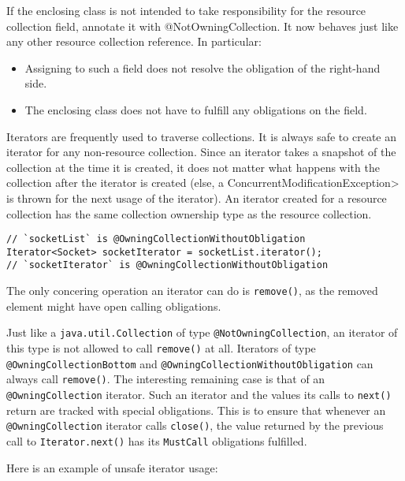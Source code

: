 If the enclosing class is not intended to take responsibility for the resource collection field, annotate it with @NotOwningCollection. It now behaves just like any other resource collection reference. In particular:

\begin{itemize}
  \item Assigning to such a field does not resolve the obligation of the right-hand side.
  \item The enclosing class does not have to fulfill any obligations on the field.
\end{itemize}

Iterators are frequently used to traverse collections. It is always safe to create an iterator for any non-resource collection. Since an iterator takes a snapshot of the collection at the time it is created, it does not matter what happens with the collection after the iterator is created (else, a \<ConcurrentModificationException> is thrown for the next usage of the iterator).
An iterator created for a resource collection has the same collection ownership type as the resource collection.

\begin{verbatim}
// `socketList` is @OwningCollectionWithoutObligation
Iterator<Socket> socketIterator = socketList.iterator();
// `socketIterator` is @OwningCollectionWithoutObligation
\end{verbatim}

The only concering operation an iterator can do is \texttt{remove()}, as the removed element might have open calling obligations.

Just like a \texttt{java.util.Collection} of type \texttt{@NotOwningCollection}, an iterator of this type is not allowed to call \texttt{remove()} at all. Iterators of type \texttt{@OwningCollectionBottom} and \texttt{@OwningCollectionWithoutObligation} can always call \texttt{remove()}. The interesting remaining case is that of an \texttt{@OwningCollection} iterator.
Such an iterator and the values its calls to \texttt{next()} return are tracked with special obligations. This is to ensure that whenever an \texttt{@OwningCollection} iterator calls \texttt{close()}, the value returned by the previous call to \texttt{Iterator.next()} has its \texttt{MustCall} obligations fulfilled.

Here is an example of unsafe iterator usage:

